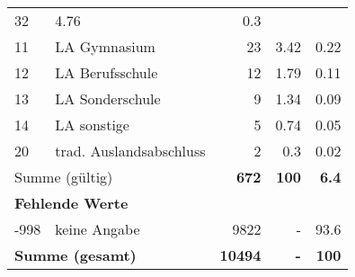 \begin{longtable}{lXrrr}
       \num{32} &
       \num[round-mode=places,round-precision=2]{4.76} &
         \num[round-mode=places,round-precision=2]{0.3} \\

     11 &
     \multicolumn{1}{X}{ LA Gymnasium   } &


       \num{23} &
       \num[round-mode=places,round-precision=2]{3.42} &
         \num[round-mode=places,round-precision=2]{0.22} \\

     12 &
     \multicolumn{1}{X}{ LA Berufsschule   } &


       \num{12} &
       \num[round-mode=places,round-precision=2]{1.79} &
         \num[round-mode=places,round-precision=2]{0.11} \\

     13 &
     \multicolumn{1}{X}{ LA Sonderschule   } &


       \num{9} &
       \num[round-mode=places,round-precision=2]{1.34} &
         \num[round-mode=places,round-precision=2]{0.09} \\

     14 &
     \multicolumn{1}{X}{ LA sonstige   } &


       \num{5} &
       \num[round-mode=places,round-precision=2]{0.74} &
         \num[round-mode=places,round-precision=2]{0.05} \\

     20 &
     \multicolumn{1}{X}{ trad. Auslandsabschluss   } &


       \num{2} &
       \num[round-mode=places,round-precision=2]{0.3} &
         \num[round-mode=places,round-precision=2]{0.02} \\
     \midrule
     \multicolumn{2}{l}{Summe (gültig)} &
       \textbf{\num{672}} &
     \textbf{\num{100}} &
       \textbf{\num[round-mode=places,round-precision=2]{6.4}} \\
     \multicolumn{5}{l}{\textbf{Fehlende Werte}}\\
       -998 &
       keine Angabe &
         \num{9822} &
        - &
         \num[round-mode=places,round-precision=2]{93.6} \\
     \midrule
     \multicolumn{2}{l}{\textbf{Summe (gesamt)}} &
          \textbf{\num{10494}} &
        \textbf{-} &
        \textbf{\num{100}} \\
     \bottomrule
     \end{longtable}
     
